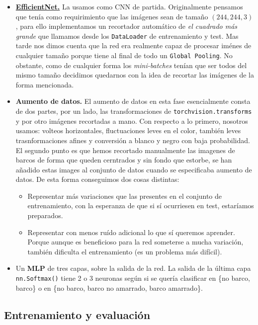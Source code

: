 \documentclass{article}
\begin{document}
\begin{itemize}
	\item  \textbf{\href{https://arxiv.org/pdf/1905.11946}{EfficientNet.}} La usamos como CNN de partida. Originalmente pensamos que tenía como requirimiento que las imágenes sean de tamaño $(244,244,3)$, para ello implementamos un recortador automático de \emph{el cuadrado más grande} que llamamos desde los \texttt{DataLoader} de entrenamiento y test. Mas tarde nos dimos cuenta que la red era realmente capaz de procesar iménes de cualquier tamaño porque tiene al final de todo un \texttt{Global Pooling}. No obstante, como de cualquier forma los \emph{mini-batches} tenían que ser todos del mismo tamaño decidimos quedarnos con la idea de recortar las imágenes de la forma mencionada.
	\item \textbf{Aumento de datos.} El aumento de datos en esta fase esencialmente consta de dos partes, por un lado, las transformaciones de \texttt{torchvision.transforms} y por otro imágenes recortadas a mano. Con respecto a lo primero, nosotros usamos: volteos horizontales, fluctuaciones leves en el color, también leves trasnformaciones afines y conversión a blanco y negro con baja probabilidad. El segundo punto es que hemos recortado manualmente las imagenes de barcos de forma que queden cerntrados y sin fondo que estorbe, se han añadido estas images al conjunto de datos cuando se especificaba aumento de datos. De esta forma conseguimos dos cosas distintas: 
	\begin{itemize}
		\item Representar más variaciones que las presentes en el conjunto de entrenamiento, con la esperanza de que si sí ocurriesen en test, estaríamos preparados.
		\item Representar con menos ruído adicional lo que sí queremos aprender. Porque aunque es beneficioso para la red someterse a mucha variación, también dificulta el entrenamiento (es un problema más difícil).
\end{itemize}
	\item Un \textbf{MLP} de tres capas, sobre la salida de la red. La salida de la última capa \texttt{nn.Softmax()} tiene 2 o 3 neuronas según si se quería clasificar en \{no barco, barco\} o en \{no barco, barco no amarrado, barco amarrado\}. 
\end{itemize}

\subsection*{Entrenamiento y evaluación}
\end{document}
